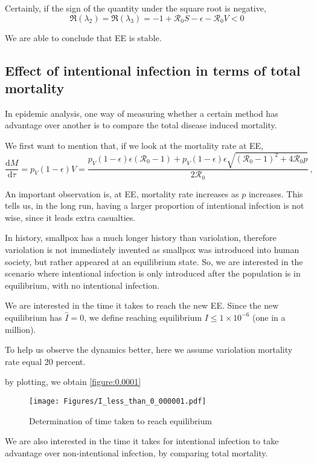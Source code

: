 \documentclass[12pt]{article}
\newcommand\dbyd[2]{\frac{\mathrm d{#1}}{\mathrm d{#2}}}
\newcommand{\R}{\mathcal{R}}
\newcommand{\pmV}{p_{V}}
\begin{document}
Certainly, if the sign of the quantity under the square root is negative,
\begin{equation}
\Re(\lambda_2)=\Re(\lambda_3)=-1+\R_0 S-\epsilon-\R_0 V<0
\end{equation}

We are able to conclude that EE is stable.

\subsection{Effect of intentional infection in terms of total mortality}

In epidemic analysis, one way of measuring whether a certain method has advantage over another is to compare the total disease induced mortality. 

We first want to mention that, if we look at the mortality rate at EE,
\begin{equation}
\dbyd{M}{\tau}=\pmV(1-\epsilon)V=\frac{\pmV(1-\epsilon)\epsilon(\R_0 -1)+ \pmV(1-\epsilon)\epsilon \sqrt{(\R_0-1)^2+4\R_0 p}}{2\R_0}\,, \label{eq:dMdt}
\end{equation}

An important observation is, at EE, mortality rate increases as $p$ increases. This tells us, in the long run, having a larger proportion of intentional infection is not wise, since it leads extra casualties.

In history, smallpox has a much longer history than variolation, therefore variolation is not immediately invented as smallpox was introduced into human society, but rather appeared at an equilibrium state. So, we are interested in the scenario where intentional infection is only introduced after the population is in equilibrium, with no intentional infection.

We are interested in the time it takes to reach the new EE. Since the new equilibrium has $\hat{I}=0$, we define reaching equilibrium $I\leq 1\times 10^{-6}$ (one in a million).

To help us observe the dynamics better, here we assume variolation mortality rate equal 20 percent.

by plotting, we obtain \autoref{figure:0.0001}
\begin{figure}[h]
  \centering
  \texttt{[image: Figures/I\_less\_than\_0\_000001.pdf]}
  \caption{Determination of time taken to reach equilibrium}
\label{figure:0.0001}
\end{figure}

We are also interested in the time it takes for intentional infection to take advantage over non-intentional infection, by comparing total mortality.
\end{document}
